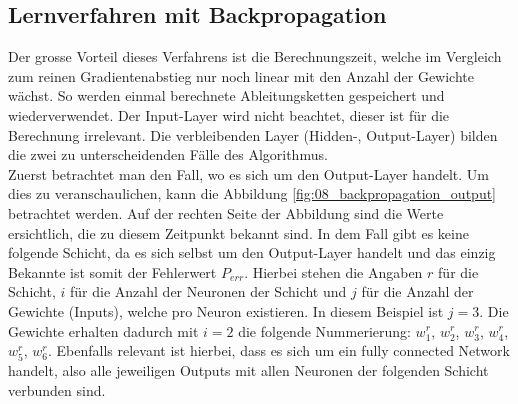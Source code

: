 \newpage
\subsection{Lernverfahren mit Backpropagation}
Der grosse Vorteil dieses Verfahrens ist die Berechnungszeit, welche im Vergleich zum reinen Gradientenabstieg nur noch
linear mit den Anzahl der Gewichte wächst. So werden einmal berechnete Ableitungsketten gespeichert und wiederverwendet.
Der Input-Layer wird nicht beachtet, dieser ist für die Berechnung irrelevant. Die verbleibenden Layer (Hidden-, Output-Layer)
bilden die zwei zu unterscheidenden Fälle des Algorithmus.
\\

Zuerst betrachtet man den Fall, wo es sich um den Output-Layer handelt. Um dies zu veranschaulichen, kann
die Abbildung \ref{fig:08_backpropagation_output} betrachtet werden. Auf der rechten Seite der Abbildung sind die Werte ersichtlich,
die zu diesem Zeitpunkt bekannt sind. In dem Fall gibt es keine folgende Schicht, da es sich selbst um den Output-Layer
handelt und das einzig Bekannte ist somit der Fehlerwert $P_{err}$. Hierbei stehen die Angaben $r$ für die Schicht,
$i$ für die Anzahl der Neuronen der Schicht und $j$ für die Anzahl der Gewichte (Inputs), welche pro Neuron existieren.
In diesem Beispiel ist $j = 3$. Die Gewichte erhalten dadurch mit $i = 2$ die folgende Nummerierung:
$w_1^r$, $w_2^r$, $w_3^r$, $w_4^r$, $w_5^r$, $w_6^r$. Ebenfalls relevant ist hierbei, dass es sich um ein \glqq fully connected
Network\grqq{} handelt, also alle jeweiligen Outputs mit allen Neuronen der folgenden Schicht verbunden sind.

